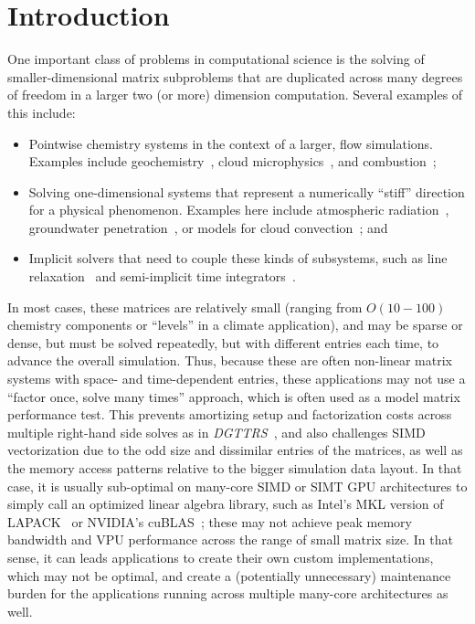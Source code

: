 \documentclass[conference]{IEEEtran}
\begin{document}
\section{Introduction}
% 
One important class of problems in computational science is the solving
  of smaller-dimensional matrix subproblems that are duplicated across
  many degrees of freedom in a larger two (or more) dimension computation.
Several examples of this include: 
\begin{itemize}
\item Pointwise chemistry systems in the context of a larger, 
  flow simulations. 
Examples include geochemistry~\cite{PFLOTRAN_2010}, 
  cloud microphysics~\cite{MG2_2015}, and combustion~\cite{PaznerEtAl_2016};
\item Solving one-dimensional systems that represent a numerically ``stiff''
  direction for a physical phenomenon.
Examples here include atmospheric radiation~\cite{RRTMG_2008}, groundwater
  penetration~\cite{CLM_PFLO_2016}, or models for 
  cloud convection~\cite{SAM_2005}; and
\item Implicit solvers that need to couple these kinds of subsystems, 
  such as line relaxation~\cite{TrottenbergEtAl_2000} and 
  semi-implicit time integrators~\cite{PaznerEtAl_2016}.
\end{itemize}
In most cases, these matrices are relatively small 
  (ranging from $O(10-100)$ chemistry components or ``levels'' 
  in a climate application), and may be sparse or dense, but must 
  be solved repeatedly, but with different entries each time, 
  to advance the overall simulation.
Thus, because these are often non-linear matrix systems with space- and 
  time-dependent entries, these applications may not use a 
  ``factor once, solve many times'' approach, which is often used 
  as a model matrix performance test.
This prevents amortizing setup and factorization costs
  across multiple right-hand side solves as in 
  \emph{DGTTRS}~\cite{IntelMKL_DGTTRS},
  and also challenges SIMD vectorization due to the odd size and
  dissimilar entries of the matrices, as well as the 
  memory access patterns relative to the bigger simulation data layout.
In that case, it is usually sub-optimal on many-core SIMD 
  or SIMT GPU architectures
  to simply call an optimized linear algebra library, 
  such as Intel's MKL version of LAPACK~\cite{mkl_website} or NVIDIA's
  cuBLAS~\cite{cublas_website}; these may not achieve peak memory bandwidth 
  and VPU performance across the range of small matrix size. 
In that sense, it can leads applications to create their own 
  custom implementations, which may not be optimal, and create a 
  (potentially unnecessary) maintenance burden for the applications 
  running across multiple many-core architectures as well. 
  
\end{document}
